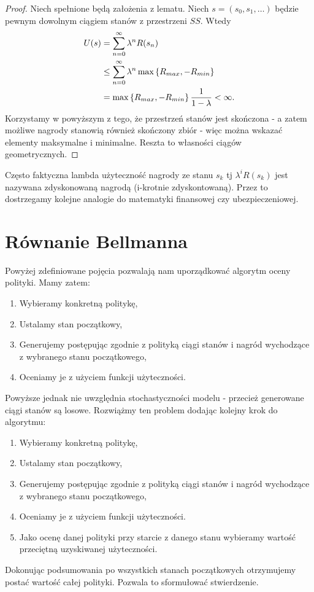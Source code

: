 \documentclass[10pt,a4paper]{book}
\begin{document}
\begin{proof}
Niech spełnione będą założenia z lematu. Niech $s = (s_0, s_1, \ldots)$ będzie pewnym dowolnym ciągiem stanów z przestrzeni $SS$. Wtedy
\begin{align*}
U(s) & = \sum_{n=0}^{\infty} \lambda^n R(s_n) \\
& \leq \sum_{n=0}^{\infty} \lambda^n \max \set{R_{max}, -R_{min}} \\
& = \max \set{R_{max}, -R_{min}} \frac{1}{1-\lambda} < \infty.
\end{align*}
Korzystamy w powyższym z tego, że przestrzeń stanów jest skończona - a zatem możliwe nagrody stanowią również skończony zbiór - więc można wskazać elementy maksymalne i minimalne. Reszta to własności ciągów geometrycznych.
\end{proof}

\begin{remark*}
Często faktyczna lambda użyteczność nagrody ze stanu $s_k$ tj $\lambda^i R(s_k)$ jest nazywana zdyskonowaną nagrodą (i-krotnie zdyskontowaną). Przez to dostrzegamy kolejne analogie do matematyki finansowej czy ubezpieczeniowej.
\end{remark*}


\section{Równanie Bellmanna}

Powyżej zdefiniowane pojęcia pozwalają nam uporządkować algorytm oceny polityki. Mamy zatem:

\begin{enumerate}
\item Wybieramy konkretną politykę,
\item Ustalamy stan początkowy,
\item Generujemy postępując zgodnie z polityką ciągi stanów i nagród wychodzące z wybranego stanu początkowego,
\item Oceniamy je z użyciem funkcji użyteczności.
\end{enumerate}

Powyższe jednak nie uwzględnia stochastyczności modelu - przecież generowane ciągi stanów są losowe. Rozwiążmy ten problem dodając kolejny krok do algorytmu:

\begin{enumerate}
\item Wybieramy konkretną politykę,
\item Ustalamy stan początkowy,
\item Generujemy postępując zgodnie z polityką ciągi stanów i nagród wychodzące z wybranego stanu początkowego,
\item Oceniamy je z użyciem funkcji użyteczności.
\item Jako ocenę danej polityki przy starcie z danego stanu wybieramy wartość przeciętną uzyskiwanej użyteczności.
\end{enumerate}
Dokonując podsumowania po wszystkich stanach początkowych otrzymujemy postać wartość całej polityki. Pozwala to sformułować stwierdzenie.
\end{document}

